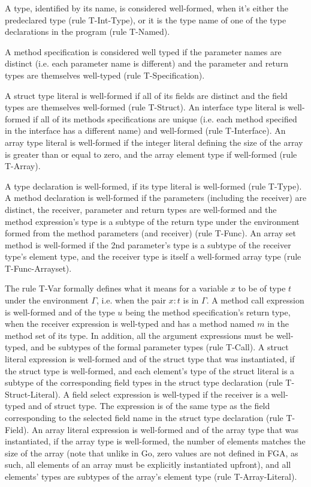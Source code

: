 A type, identified by its name, is considered well-formed, when it's either the
predeclared  type (rule T-Int-Type), or it is the type name of one of
the type declarations in the program (rule T-Named).

A method specification is considered well typed if the parameter names are
distinct (i.e. each parameter name is different) and the parameter and return
types are themselves well-typed (rule T-Specification).

A struct type literal is well-formed if all of its fields are distinct and the
field types are themselves well-formed (rule T-Struct). An interface type literal is well-formed
if all of its methods specifications are unique (i.e. each method specified in
the interface has a different name) and well-formed (rule T-Interface). An array type literal is
well-formed if the integer literal defining the size of the array is greater
than or equal to zero, and the array element type if well-formed (rule T-Array).

A type declaration is well-formed, if its type literal is well-formed (rule
T-Type). A method declaration is well-formed if the parameters (including the
receiver) are distinct, the receiver, parameter and return types are well-formed
and the method expression's type is a subtype of the return type under the
environment formed from the method parameters (and receiver) (rule T-Func). An
array set method is well-formed if the 2nd parameter's type is a subtype of the
receiver type's element type, and the receiver type is itself a well-formed
array type (rule T-Func-Arrayset).

The rule T-Var formally defines what it means for a variable $x$ to be of type
$t$ under the environment $\Gamma$, i.e. when the pair $x : t$ is in $\Gamma$. A
method call expression is well-formed and of the type $u$ being the method
specification's return type, when the receiver expression is well-typed and has
a method named $m$ in the method set of its type. In addition, all the argument
expressions must be well-typed, and be subtypes of the formal parameter types
(rule T-Call). A struct literal expression is well-formed and of the struct type
that was instantiated, if the struct type is well-formed, and each element's
type of the struct literal is a subtype of the corresponding field types in the
struct type declaration (rule T-Struct-Literal). A field select expression is
well-typed if the receiver is a well-typed and of struct type. The expression is
of the same type as the field corresponding to the selected field name in the
struct type declaration (rule T-Field). An array literal expression is
well-formed and of the array type that was instantiated, if the array type is
well-formed, the number of elements matches the size of the array (note that
unlike in Go, zero values are not defined in FGA, as such, all elements of an
array must be explicitly instantiated upfront), and all elements' types are
subtypes of the array's element type (rule T-Array-Literal).

